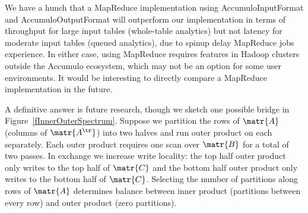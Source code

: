 


We have a hunch that a MapReduce implementation using AccumuloInputFormat and AccumuloOutputFormat 
will outperform our implementation in terms of throughput for large input tables (whole-table analytics)
but not latency for moderate input tables (queued analytics), due to spinup delay MapReduce jobs experience.
In either case, using MapReduce requires features in Hadoop clusters outside the 
Accumulo ecosystem, which may not be an option for some user environments.
It would be interesting to directly compare a MapReduce implementation in the future.



A definitive answer is future research, though we sketch one possible bridge in Figure~\ref{fInnerOuterSpectrum}.
Suppose we partition the rows of $\matr{A}$ (columns of $\matr{A^\tr}$) into two halves 
and run outer product on each separately.
Each outer product requires one scan over $\matr{B}$ for a total of two passes.
In exchange we increase write locality:
the top half outer product only writes to the top half of $\matr{C}$ and 
the bottom half outer product only writes to the bottom half of $\matr{C}$.
Selecting the number of partitions along rows of $\matr{A}$ determines
balance between inner product (partitions between every row) and outer product (zero partitions).





